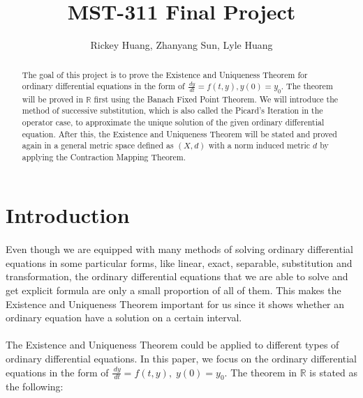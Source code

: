 \documentclass{article}
\title{MST-311 Final Project}
\author{Rickey Huang, Zhanyang Sun, Lyle Huang}
\theoremstyle{definition}
\newtheorem{definition}{Definition}[section]
\theoremstyle{remark}
\theoremstyle{example}
\begin{document}
\maketitle

\begin{abstract}
    The goal of this project is to prove the Existence and Uniqueness Theorem for ordinary differential equations in the form of $\tfrac{\,dy}{\,dt} = f(t,y), y(0) = y_0$. The theorem will be proved in $\mathbb{R}$ first using the Banach Fixed Point Theorem. We will introduce the method of successive substitution, which is also called the Picard's Iteration in the operator case, to approximate the unique solution of the given ordinary differential equation. After this, the Existence and Uniqueness Theorem will be stated and proved again in a general metric space defined as $(X,d)$ with a norm induced metric $d$ by applying the Contraction Mapping Theorem.
\end{abstract}

\section{Introduction}

\paragraph{  }

Even though we are equipped with many methods of solving ordinary differential equations in some particular forms, like linear, exact, separable, substitution and transformation, the ordinary differential equations that we are able to solve and get explicit formula are only a small proportion of all of them. This makes the Existence and Uniqueness Theorem important for us since it shows whether an ordinary equation have a solution on a certain interval. 

\paragraph{  }

The Existence and Uniqueness Theorem could be applied to different types of ordinary differential equations. In this paper, we focus on the ordinary differential equations in the form of $\tfrac{\,dy}{\,dt} = f(t,y),\; y(0) = y_0$. The theorem in $\mathbb{R}$ is stated as the following:

 
\end{document}
